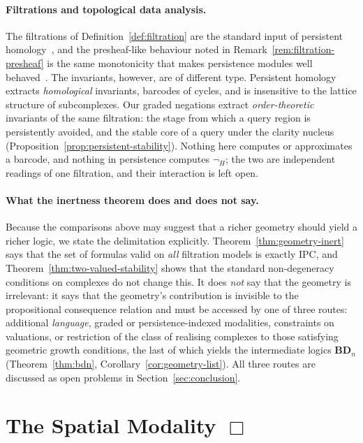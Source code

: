 \documentclass[final,12pt]{elsarticle}
\theoremstyle{plain}
\theoremstyle{definition}
\begin{document}
\paragraph{Filtrations and topological data analysis.}
The filtrations of Definition~\ref{def:filtration} are the standard input of
persistent homology~\cite{chazal2016}, and the presheaf-like behaviour noted in
Remark~\ref{rem:filtration-presheaf} is the same monotonicity that makes
persistence modules well behaved~\cite{bubenikscott2014}. The invariants,
however, are of different type. Persistent homology extracts
\emph{homological} invariants, barcodes of cycles, and is insensitive to the
lattice structure of subcomplexes. Our graded negations extract
\emph{order-theoretic} invariants of the same filtration: the stage from which
a query region is persistently avoided, and the stable core of a query under
the clarity nucleus (Proposition~\ref{prop:persistent-stability}). Nothing here
computes or approximates a barcode, and nothing in persistence computes
\( \neg_{H} \); the two are independent readings of one filtration, and their
interaction is left open.

\paragraph{What the inertness theorem does and does not say.}
Because the comparisons above may suggest that a richer geometry should yield a
richer logic, we state the delimitation explicitly. Theorem~\ref{thm:geometry-inert}
says that the set of formulas valid on \emph{all} filtration models is exactly
IPC, and Theorem~\ref{thm:two-valued-stability} shows that the standard
non-degeneracy conditions on complexes do not change this. It does \emph{not}
say that the geometry is irrelevant: it says that the geometry's contribution
is invisible to the propositional consequence relation and must be accessed
by one of three routes: additional \emph{language}, graded or
persistence-indexed modalities, constraints on valuations, or restriction of
the class of realising complexes to those satisfying geometric growth
conditions, the last of which yields the intermediate logics
\( \mathbf{BD}_{n} \) (Theorem~\ref{thm:bdn}, Corollary~\ref{cor:geometry-list}).
All three routes are discussed as open problems in Section~\ref{sec:conclusion}.

\section{The Spatial Modality \texorpdfstring{$\Box$}{Box}}
\label{sec:box}
\end{document}

